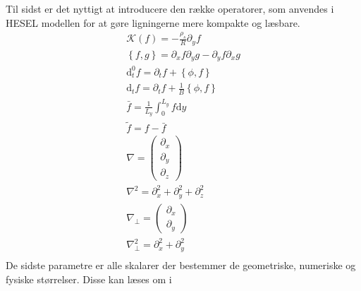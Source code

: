 Til sidst er det nyttigt at introducere den række operatorer, som anvendes i HESEL modellen for at gøre ligningerne mere kompakte og læsbare.
\begin{gather}
    \mathcal{K}(f)= - \frac{\rho_s}{R}\partial_y f \label{curvature}\\
    \left\{ f, g\right\} = \partial_x f \partial_y g - \partial_y f \partial_x g \label{poission}\\
    \mathrm{d}_t^0 f = \partial_t f + \left\{\phi, f \right\} \label{dt0}\\
    \mathrm{d}_t f = \partial_t f  + \frac{1}{B}  \left\{ \phi , f \right\} \label{dt} \\    
    \bar f = \frac{1}{L_y}\int_0^{L_y} f \mathrm{d}y \label{bar}\\
    \tilde f = f - \bar f\label{tilde}\\
    \nabla = \begin{pmatrix} \partial_x \\ \partial_y \\ \partial_z \end{pmatrix} \label{nabla} \\
    \nabla^2 = \partial_x^2 + \partial_y^2 + \partial_z^2 \label{nabla2}\\
    \nabla_\perp = \begin{pmatrix} \partial_x \\ \partial_y \end{pmatrix} \label{nable_perp}\\
    \nabla_\perp^2 = \partial_x^2 + \partial_y^2 \label{nabla2_perp}\\
\end{gather}
De sidste parametre er alle skalarer der bestemmer de geometriske, numeriske og fysiske størrelser. Disse kan læses om i \cite{udledning_af_hesel}


\newpage
